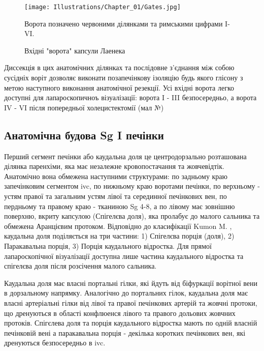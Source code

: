 \begin{refsection}
\begin{figure}[h]
\caption{Вхідні "ворота" капсули Лаенека}

\texttt{[image: Illustrations/Chapter\_01/Gates.jpg]}
\label{fig:Gates}

\small
Ворота позначено червоними ділянками та римськими цифрами I-VI.
\end{figure}


Диссекція в цих анатомічних ділянках та послідовне з'єднання між собою сусідніх воріт дозволяє виконати позапечінкову ізоляцію будь якого глісону з метою наступного виконання анатомічної резекції. Усі вхідні ворота легко доступні для лапароскопичноъ візуалізації: ворота I - III безпосередньо, а ворота IV - VI після попередньої холецистектомії (мал №)

\subsection{Анатомічна будова Sg I печінки}

Перший сегмент печінки або каудальна доля це центродорзально розташована ділянка паренхіми, яка має незалежне кровопостачання та жовчевідтік. Анатомічно вона обмежена наступними структурами: по задньому краю запечінковим сегментом \acrshort{ivc}, по нижньому краю воротами печінки, по верхньому - устям правої та загальним устям лівої та серединної печінкових вен, по пердньому та правому краю - тканиною Sg 4-8, а по лівому має зовнішню поверхню, вкриту капсулою (Спігелєва доля), яка пролабує до малого сальника та обмежена Аранцієвим протоком. Відповідно до класифікації Kumon M. \cite{Kumon2017}, каудальна доля поділяється на три частини: 1) Спігелєва порція (доля),  2) Паракавальна порція, 3) Порція каудального відростка. Для прямої лапароскопічної візуалізації  доступна лише частина каудального відростка та спігелєва доля після розсічення малого сальника.

Каудальна доля має власні портальні гілки, які йдуть від біфуркації ворітної вени в дорзальному напрямку. Аналогічно до портальних гілок, каудальна доля має власні артеріальні гілки від лівої та правої печінкових артерій та жовчні протоки, що дренуються в області конфлюенся лівого та правого дольових жовчних протоків. Спігєлева доля та порція каудального відростка мають по одній власній печінковій вені а паракавальна порція - декілька коротких печінкових вен, які дренуються безпосередньо в \acrshort{ivc}. 


\end{refsection}
